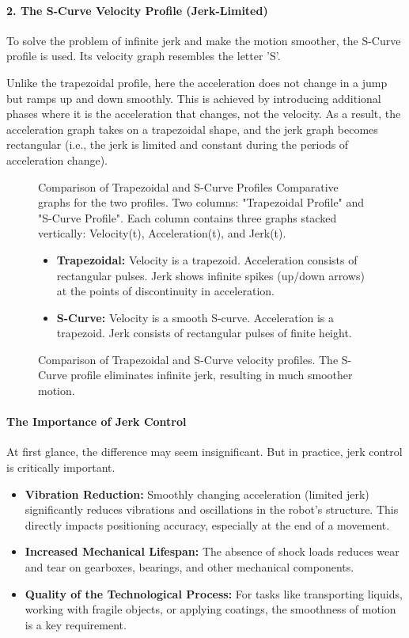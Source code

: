 \paragraph{2. The S-Curve Velocity Profile (Jerk-Limited)}
To solve the problem of infinite jerk and make the motion smoother, the S-Curve profile is used. Its velocity graph resembles the letter 'S'.

Unlike the trapezoidal profile, here the acceleration does not change in a jump but ramps up and down smoothly. This is achieved by introducing additional phases where it is the acceleration that changes, not the velocity. As a result, the acceleration graph takes on a trapezoidal shape, and the jerk graph becomes rectangular (i.e., the jerk is limited and constant during the periods of acceleration change).

\begin{figure}[h!]
    \centering
    \begin{infobox}{Comparison of Trapezoidal and S-Curve Profiles}
        Comparative graphs for the two profiles. Two columns: "Trapezoidal Profile" and "S-Curve Profile". Each column contains three graphs stacked vertically: Velocity(t), Acceleration(t), and Jerk(t).
        \begin{itemize}
            \item \textbf{Trapezoidal:} Velocity is a trapezoid. Acceleration consists of rectangular pulses. Jerk shows infinite spikes (up/down arrows) at the points of discontinuity in acceleration.
            \item \textbf{S-Curve:} Velocity is a smooth S-curve. Acceleration is a trapezoid. Jerk consists of rectangular pulses of finite height.
        \end{itemize}
    \end{infobox}
    \caption{Comparison of Trapezoidal and S-Curve velocity profiles. The S-Curve profile eliminates infinite jerk, resulting in much smoother motion.}
    \label{fig:velocity_profiles}
\end{figure}

\paragraph{The Importance of Jerk Control}
At first glance, the difference may seem insignificant. But in practice, jerk control is critically important.
\begin{itemize}
    \item \textbf{Vibration Reduction:} Smoothly changing acceleration (limited jerk) significantly reduces vibrations and oscillations in the robot's structure. This directly impacts positioning accuracy, especially at the end of a movement.
    \item \textbf{Increased Mechanical Lifespan:} The absence of shock loads reduces wear and tear on gearboxes, bearings, and other mechanical components.
    \item \textbf{Quality of the Technological Process:} For tasks like transporting liquids, working with fragile objects, or applying coatings, the smoothness of motion is a key requirement.
\end{itemize}

